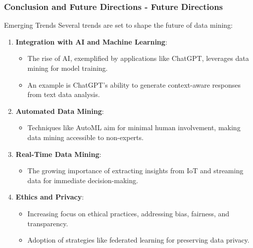 \documentclass[aspectratio=169]{beamer}
\begin{document}
\begin{frame}[fragile]
    \frametitle{Conclusion and Future Directions - Future Directions}
    \begin{block}{Emerging Trends}
        Several trends are set to shape the future of data mining:
    \end{block}
    \begin{enumerate}
        \item \textbf{Integration with AI and Machine Learning}:
        \begin{itemize}
            \item The rise of AI, exemplified by applications like ChatGPT, leverages data mining for model training.
            \item An example is ChatGPT's ability to generate context-aware responses from text data analysis.
        \end{itemize}
        
        \item \textbf{Automated Data Mining}:
        \begin{itemize}
            \item Techniques like AutoML aim for minimal human involvement, making data mining accessible to non-experts.
        \end{itemize}
        
        \item \textbf{Real-Time Data Mining}:
        \begin{itemize}
            \item The growing importance of extracting insights from IoT and streaming data for immediate decision-making.
        \end{itemize}
        
        \item \textbf{Ethics and Privacy}:
        \begin{itemize}
            \item Increasing focus on ethical practices, addressing bias, fairness, and transparency.
            \item Adoption of strategies like federated learning for preserving data privacy.
        \end{itemize}
    \end{enumerate}
\end{frame}
\end{document}
